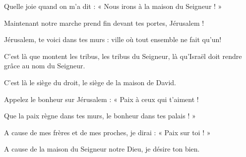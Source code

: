 \item Quelle joie quand on m'a dit : « Nous irons à la maison du Seigneur ! »

\item Maintenant notre marche prend fin devant tes portes, Jérusalem !

\item Jérusalem, te voici dans tes murs : ville où tout ensemble ne fait qu'un!

\item C'est là que montent les tribus, les tribus du Seigneur, là qu'Israël doit rendre grâce au nom du Seigneur.

\item C'est là le siège du droit, le siège de la maison de David.

\item Appelez le bonheur sur Jérusalem : « Paix à ceux qui t'aiment !

\item Que la paix règne dans tes murs, le bonheur dans tes palais ! »

\item A cause de mes frères et de mes proches, je dirai : « Paix sur toi ! »

\item A cause de la maison du Seigneur notre Dieu, je désire ton bien.
